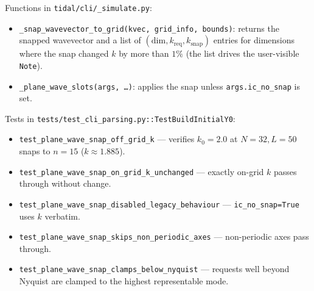 Functions in \texttt{tidal/cli/\_simulate.py}:
\begin{itemize}
  \item \texttt{\_snap\_wavevector\_to\_grid(kvec, grid\_info, bounds)}:
        returns the snapped wavevector and a list of
        $(\mathrm{dim}, k_{\mathrm{req}}, k_{\mathrm{snap}})$ entries
        for dimensions where the snap changed $k$ by more than $1\%$
        (the list drives the user-visible \texttt{Note}).
  \item \texttt{\_plane\_wave\_slots(args, \ldots)}: applies the snap
        unless \texttt{args.ic\_no\_snap} is set.
\end{itemize}

Tests in \texttt{tests/test\_cli\_parsing.py::TestBuildInitialY0}:
\begin{itemize}
  \item \texttt{test\_plane\_wave\_snap\_off\_grid\_k} --- verifies
        $k_0 = 2.0$ at $N = 32, L = 50$ snaps to $n = 15$ ($k \approx 1.885$).
  \item \texttt{test\_plane\_wave\_snap\_on\_grid\_k\_unchanged} ---
        exactly on-grid $k$ passes through without change.
  \item \texttt{test\_plane\_wave\_snap\_disabled\_legacy\_behaviour} ---
        \texttt{ic\_no\_snap=True} uses $k$ verbatim.
  \item \texttt{test\_plane\_wave\_snap\_skips\_non\_periodic\_axes} ---
        non-periodic axes pass through.
  \item \texttt{test\_plane\_wave\_snap\_clamps\_below\_nyquist} ---
        requests well beyond Nyquist are clamped to the highest
        representable mode.
\end{itemize}
